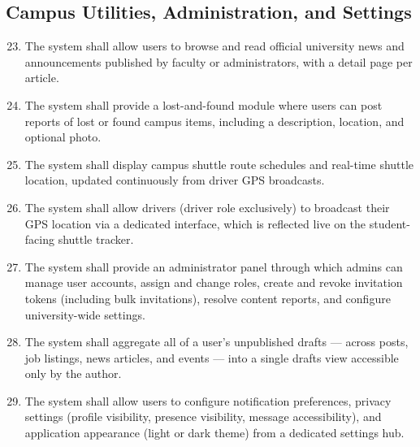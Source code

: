 \documentclass[12pt, a4paper]{article}
\begin{document}
\subsection{Campus Utilities, Administration, and Settings}

\begin{enumerate}[label=\textbf{FR-\arabic*:}, leftmargin=*, align=left]
\setcounter{enumi}{22}

    \item The system shall allow users to browse and read official university news
    and announcements published by faculty or administrators, with a detail page
    per article.

    \item The system shall provide a lost-and-found module where users can post
    reports of lost or found campus items, including a description, location, and
    optional photo.

    \item The system shall display campus shuttle route schedules and real-time
    shuttle location, updated continuously from driver GPS broadcasts.

    \item The system shall allow drivers (driver role exclusively) to broadcast
    their GPS location via a dedicated interface, which is reflected live on the
    student-facing shuttle tracker.

    \item The system shall provide an administrator panel through which admins can
    manage user accounts, assign and change roles, create and revoke invitation
    tokens (including bulk invitations), resolve content reports, and configure
    university-wide settings.

    \item The system shall aggregate all of a user's unpublished drafts --- across
    posts, job listings, news articles, and events --- into a single drafts view
    accessible only by the author.

    \item The system shall allow users to configure notification preferences,
    privacy settings (profile visibility, presence visibility, message
    accessibility), and application appearance (light or dark theme) from a
    dedicated settings hub.

\end{enumerate}

\clearpage
\end{document}
